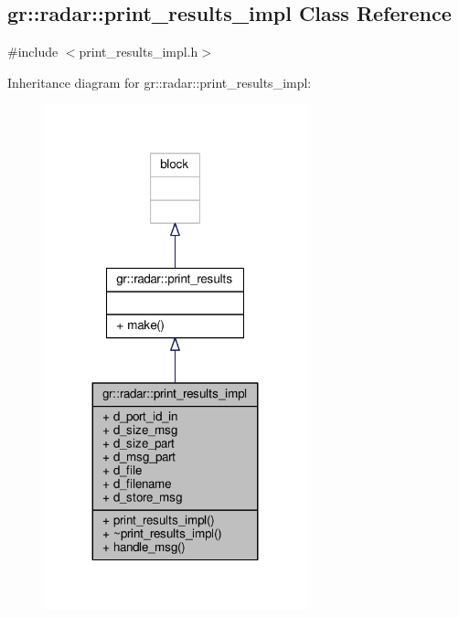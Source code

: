 \subsection{gr\+:\+:radar\+:\+:print\+\_\+results\+\_\+impl Class Reference}
\label{classgr_1_1radar_1_1print__results__impl}


{\ttfamily \#include $<$print\+\_\+results\+\_\+impl.\+h$>$}



Inheritance diagram for gr\+:\+:radar\+:\+:print\+\_\+results\+\_\+impl\+:
\nopagebreak
\begin{figure}[H]
\begin{center}
\leavevmode
\includegraphics[width=215pt]{d6/dee/classgr_1_1radar_1_1print__results__impl__inherit__graph}
\end{center}
\end{figure}


